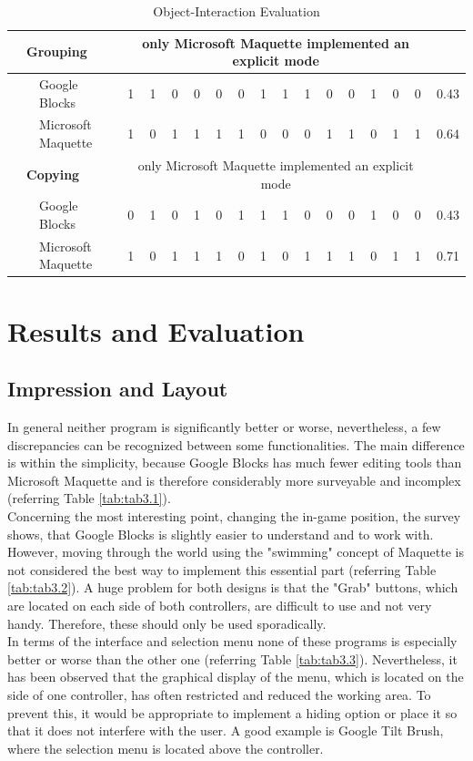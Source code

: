 \documentclass{report}
\begin{document}
\begin{table}[H]
\begin{tabular}{@{}|lll|llllllllllllll|r|@{}}
				& \multicolumn{2}{l|}{\textbf{Grouping}} & \multicolumn{14}{c|}{\small{only Microsoft Maquette implemented an explicit mode}} &\\ \hline
				& & Google Blocks & 1 & 1 & 0 & 0 & 0 & 0& 1 & 1 & 1 & 0 & 0 & 1 & 0 & 0 & 0.43 \\
				& & Microsoft Maquette & 1 & 0 & 1 & 1 & 1 & 1 & 0 & 0 & 0 & 1 & 1 & 0 & 1 & 1 & 0.64 \\ \hline				
				
				& \multicolumn{2}{l|}{\textbf{Copying}} & \multicolumn{14}{c|}{\small{only Microsoft Maquette implemented an explicit mode}} &\\ \hline
				& & Google Blocks & 0 & 1 & 0 & 1 & 0 & 1 & 1 & 1 & 0 & 0 & 0 & 1 & 0 & 0 & 0.43 \\
				& & Microsoft Maquette & 1 & 0 & 1 & 1 & 1 & 0 & 1 & 0 & 1 & 1 & 1 & 0 & 1 & 1 & 0.71 \\ \hline
			\end{tabular}
			\caption{Object-Interaction Evaluation}
			\label{tab:tab3.4}					
		\end{table}
	\closesection
			
	\section{Results and Evaluation}
	\startsection
		\vspace{0.1cm}
		\subsection{Impression and Layout}
		\startsubsection
			In general neither program is significantly better or worse, nevertheless, a few discrepancies can be recognized between some functionalities. The main difference is within the simplicity, because Google Blocks has much fewer editing tools than Microsoft Maquette and is therefore considerably more surveyable and incomplex (referring Table \ref{tab:tab3.1}). \\
			Concerning the most interesting point, changing the in-game position, the survey shows, that Google Blocks is slightly easier to understand and to work with. However, moving through the world using the "swimming" concept of Maquette is not considered the best way to implement this essential part (referring Table \ref{tab:tab3.2}). A huge problem for both designs is that the "Grab" buttons, which are located on each side of both controllers, are difficult to use and not very handy. Therefore, these should only be used sporadically. \\
			In terms of the interface and selection menu none of these programs is especially better or worse than the other one (referring Table \ref{tab:tab3.3}). Nevertheless, it has been observed that the graphical display of the menu, which is located on the side of one controller, has often restricted and reduced the working area. To prevent this, it would be appropriate to implement a hiding option or place it so that it does not interfere with the user. A good example is Google Tilt Brush, where the selection menu is located above the controller. \\
		\closesection
\end{document}
